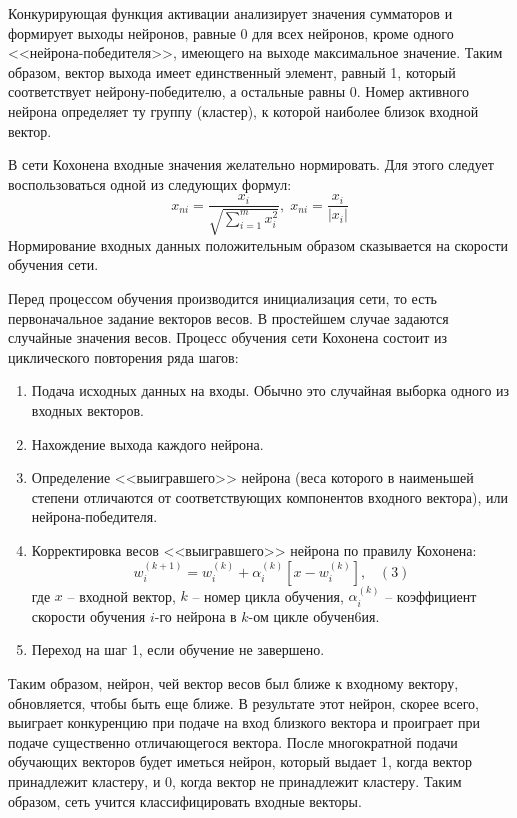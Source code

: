 \documentclass[bachelor, och, referat]{SCWorks}
\begin{document}
Конкурирующая функция активации анализирует значения сумматоров и
формирует выходы нейронов, равные 0 для всех нейронов, кроме одного
<<нейрона-победителя>>, имеющего на выходе максимальное значение. Таким
образом, вектор выхода имеет единственный элемент, равный 1, который
соответствует нейрону-победителю, а остальные равны 0. Номер активного
нейрона определяет ту группу (кластер), к которой наиболее близок
входной вектор. 

В сети Кохонена входные значения желательно
нормировать. Для этого следует воспользоваться одной из следующих
формул: 
\[ x_{ni} = \frac{x_i}{\sqrt{\sum_{i=1}^{m} x_i^2}}, \; x_{ni} = \frac{x_i}{|x_i|} \]
Нормирование входных данных положительным образом сказывается на
скорости обучения сети.

Перед процессом обучения производится инициализация сети, то есть
первоначальное задание векторов весов. В простейшем случае задаются
случайные значения весов. Процесс обучения сети Кохонена состоит из
циклического повторения ряда шагов: 
\begin{enumerate}
    \item Подача исходных данных на входы. Обычно это случайная выборка
    одного из входных векторов.
    \item Нахождение выхода каждого нейрона. 
    \item Определение <<выигравшего>> нейрона (веса которого в наименьшей
    степени отличаются от соответствующих компонентов входного вектора),
    или нейрона-победителя. 
    \item Корректировка весов <<выигравшего>> нейрона по правилу Кохонена:
    \[ w_i^{(k + 1)} = w_i^{(k)} + \alpha_i^{(k)} [x - w_i^{(k)}], \; \; \; (3) \]
    где $x$ -- входной вектор, $k$ -- номер цикла обучения, 
    $\alpha_i^{(k)}$ -- коэффициент скорости обучения $i$-го нейрона 
    в $k$-ом цикле обучен6ия.
    \item Переход на шаг 1, если обучение не завершено.
\end{enumerate}

Таким образом, нейрон, чей вектор весов был ближе к входному вектору,
обновляется, чтобы быть еще ближе. В результате этот нейрон, скорее всего,
выиграет конкуренцию при подаче на вход близкого вектора и проиграет
при подаче существенно отличающегося вектора. После многократной
подачи обучающих векторов будет иметься нейрон, который выдает 1, когда
вектор принадлежит кластеру, и 0, когда вектор не принадлежит кластеру.
Таким образом, сеть учится классифицировать входные векторы. 
\end{document}
